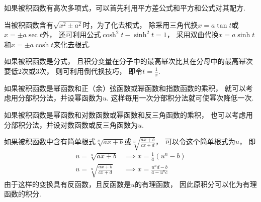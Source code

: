 如果被积函数有高次多项式，可以首先利用平方差公式和平方和公式对其配方.

当被积函数含有\(\sqrt{x^2 \pm a^2}\)时，为了化去根式，
除采用三角代换\(x = a \tan t\)或\(x = \pm a \sec t\)外，
还可利用公式\(\cosh^2 t - \sinh^2 t = 1\)，
采用双曲代换\(x = a \sinh t\)和\(x = \pm a \cosh t\)来化去根式.

如果被积函数是分式，
且积分变量在分子中的最高幂次比其在分母中的最高幂次要低2次或3次，
则可利用倒代换技巧，
即令\(t=\frac{1}{x}\).

如果被积函数是幂函数和正（余）弦函数或幂函数和指数函数的乘积，
就可以考虑用分部积分法，并设幂函数为\(u\).
这样每用一次分部积分法就可使幂次降低一次.

如果被积函数是幂函数和对数函数或幂函数和反三角函数的乘积，
也可以考虑用分部积分法，并设对数函数或反三角函数为\(u\).

如果被积函数中含有简单根式\(\sqrt[n]{ax+b}\)或\(\sqrt[n]{\frac{ax+b}{cx+d}}\)，
可以令这个简单根式为\(u\)，
即\begin{align*}
	u=\sqrt[n]{ax+b} &\implies x=\frac{1}{a}(u^n-b) \\
	u=\sqrt[n]{\frac{ax+b}{cx+d}} &\implies x=\frac{u^nd-b}{a-u^nc}
\end{align*}
由于这样的变换具有反函数，且反函数是\(u\)的有理函数，
因此原积分可以化为有理函数的积分.

